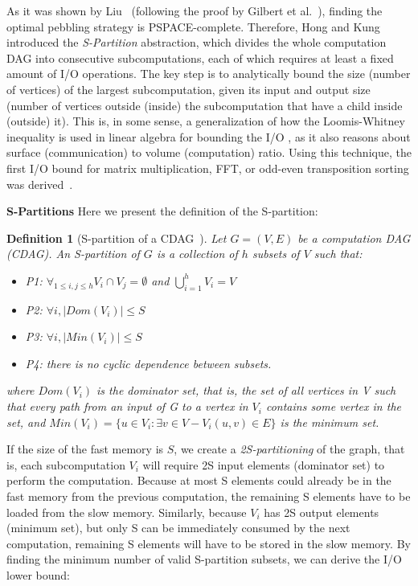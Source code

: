 \documentclass[sigplan,review,anonymous]{acmart}\settopmatter{printfolios=true,printccs=false,printacmref=false}
\newtheorem{defn}{Definition}
\newcommand{\macb}[1]{\textbf{\textsf{#1}}}
\begin{document}
As it was shown by Liu~\cite{redbluecomplete} (following the proof by Gilbert
et al.~\cite{pebblegameregister}), finding the optimal pebbling strategy is
PSPACE-complete.  Therefore, Hong and Kung introduced the \textit{S-Partition}
abstraction,  which divides the whole
computation DAG into consecutive subcomputations, each of which requires at
least a fixed amount of I/O operations. The key step is to
analytically bound the size (number of vertices) of the largest subcomputation,
given its input and output size (number of vertices outside (inside) the
subcomputation that have a child inside (outside) it). This is, in some sense, a
generalization of how the Loomis-Whitney inequality \cite{loomisWhitney} is
used in linear algebra for bounding the I/O \cite{loomisApplied}, as it also 
reasons
about surface (communication) to volume (computation) ratio. Using this
technique, the first I/O bound for matrix multiplication, FFT, or odd-even
transposition sorting was derived~\cite{redblue}.

\macb{S-Partitions}
%
Here we present the definition of the 
S-partition:

\begin{defn}[S-partition of a CDAG~\cite{redblue}]
	Let $G = (V,E)$ be a computation DAG (CDAG). An S-partition of $G$ 
	is a collection of $h$ subsets of $V$ such that:
	
	\begin{itemize}
		\item P1: $\forall_{1 \le i,j \le h} V_i \cap V_j =\emptyset$ and 
		$\bigcup_{i=1}^{h} V_i=V$
		\item P2: $\forall i, |Dom(V_i)| \le S$
		\item P3: $\forall i, |Min(V_i)| \le S$
		\item P4: there is no cyclic dependence between subsets.
	\end{itemize}
	where $Dom(V_i)$ is the \textit{dominator set}, that is, the set of all 
	vertices in V such that every path from an input of G to a vertex in $V_i$ 
	contains some vertex in the set, and
	$Min(V_i) = \{u \in V_i: \exists{v \in V - V_i} (u,v) \in E \}$ is the 
	\textit{minimum set}.
\end{defn}

If the size of the fast memory is $S$, we create a \textit{2S-partitioning} 
of the graph, that is, each subcomputation $V_i$ will require 2S input 
elements (dominator set) to perform the computation. Because at most S 
elements could already be in the fast memory from the previous computation, 
the remaining S elements have to be loaded from the slow memory. Similarly, 
because $V_i$ has 2S output elements (minimum set), but only S can be 
immediately consumed by the next computation, remaining S elements will 
have to be stored in the slow memory. By finding the minimum number of 
valid S-partition subsets, we can derive the I/O lower bound:
\end{document}
